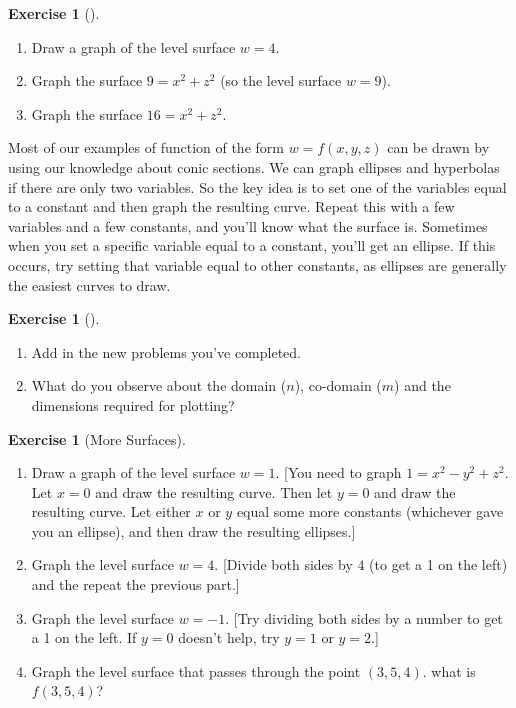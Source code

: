 \documentclass[10pt,]{book}
\theoremstyle{plain}
\theoremstyle{definition}
\theoremstyle{definition}
\theoremstyle{definition}
\theoremstyle{definition}
\newtheorem{exploration}[project]{Exercise}
\theoremstyle{definition}
\numberwithin{equation}{section}
\begin{document}
\begin{exploration}[]\label{exploration-114}
\leavevmode%
\begin{enumerate}[font=\bfseries,label=(\alph*),ref=\alph*]
\item\label{task-228} Draw a graph of the level surface \(w=4\).%
\item\label{task-229} Graph the surface \(9=x^2+z^2\) (so the level surface \(w=9\)).%
\item\label{task-230} Graph the surface \(16=x^2+z^2\).%
\end{enumerate}
\end{exploration}
Most of our examples of function of the form \(w=f(x,y,z)\) can be drawn by using our knowledge about conic sections. We can graph ellipses and hyperbolas if there are only two variables. So the key idea is to set one of the variables equal to a constant and then graph the resulting curve. Repeat this with a few variables and a few constants, and you'll know what the surface is. Sometimes when you set a specific variable equal to a constant, you'll get an ellipse. If this occurs, try setting that variable equal to other constants, as ellipses are generally the easiest curves to draw.%
\begin{exploration}[]\label{exploration-115}
\leavevmode%
\begin{enumerate}[font=\bfseries,label=(\alph*),ref=\alph*]
\item\label{task-231} Add in the new problems you've completed.%
\item\label{task-232} What do you observe about the domain (\(n\)), co-domain (\(m\)) and the dimensions required for plotting?%
\end{enumerate}
\end{exploration}
\begin{exploration}[More Surfaces]\label{exploration-116}
\leavevmode%
\begin{enumerate}[font=\bfseries,label=(\alph*),ref=\alph*]
\item\label{task-233} Draw a graph of the level surface \(w=1\). [You need to graph \(1=x^2-y^2+z^2\). Let \(x=0\) and draw the resulting curve. Then let \(y=0\) and draw the resulting curve. Let either \(x\) or \(y\) equal some more constants (whichever gave you an ellipse), and then draw the resulting ellipses.]%
\item\label{task-234} Graph the level surface \(w=4\). [Divide both sides by \(4\) (to get a 1 on the left) and the repeat the previous part.]%
\item\label{task-235} Graph the level surface \(w=-1\). [Try dividing both sides by a number to get a 1 on the left. If \(y=0\) doesn't help, try \(y=1\) or \(y=2\).]%
\item\label{task-236} Graph the level surface that passes through the point \((3,5,4)\). what is \(f(3,5,4)\)?%
%
\end{enumerate}
\end{exploration}
\typeout{************************************************}
\typeout{************************************************}
\end{document}
